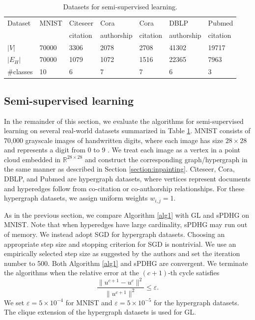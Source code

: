 \documentclass{article}
\theoremstyle{definition}
\begin{document}
\begin{table}[H]
  \centering
  \caption{Datasets for semi-supervised learning.}
    \begin{tabular}{lllllll}
    \toprule
    Dataset & MNIST & Citeseer & Cora & Cora & DBLP & Pubmed\\
            &       & citation & authorship & citation & authorship & citation \\
    \midrule
    $|V|$ & 70000 & 3306 & 2078 & 2708 & 41302 & 19717 \\
    $|E_H|$ & 70000 & 1079 & 1072 & 1516 & 22365 & 7963 \\
    \#classes & 10 & 6   & 7    & 7    & 6     & 3 \\
    \bottomrule
    \end{tabular}%
  \label{table:dataset}%
\end{table}



\subsection{Semi-supervised learning}
In the remainder of this section, we evaluate the algorithms for semi-supervised learning on several real-world datasets summarized in Table \ref{table:dataset}.
MNIST consists of 70,000 grayscale images of handwritten digits, where each image has size $28 \times 28$ and represents a digit from 0 to 9 \cite{lecun1998gradient}. We treat each image as a vertex in a point cloud embedded in $\mathbb{R}^{28 \times 28}$ and construct the corresponding graph/hypergraph in the same manner as described in Section \ref{section:inpainting}.
Citeseer, Cora, DBLP, and Pubmed \cite{sen2008collective} are hypergraph datasets, where vertices represent documents and hyperedges follow from co-citation or co-authorship relationships. For these hypergraph datasets, we assign uniform weights $w_{i,j} = 1$.


As in the previous section, we compare Algorithm \ref{alg1} with GL and sPDHG on MNIST.
Note that when hyperedges have large cardinality, sPDHG may run out of memory.
We instead adopt SGD for hypergraph datasets.
Choosing an appropriate step size and stopping criterion for SGD is nontrivial. We use an empirically selected step size as suggested by the authors \cite{zhang2017re} and set the iteration number to 500.
Both Algorithm \ref{alg1} and sPDHG are convergent.
We terminate the algorithms when the relative error at the $(c+1)$-th cycle satisfies
\begin{equation*}
  \frac{\|u^{c+1}-u^c\|^2}{\|u^{c+1}\|^2}\leq \varepsilon.
\end{equation*}
We set $\varepsilon=5\times 10^{-4}$ for MNIST and $\varepsilon=5\times 10^{-5}$ for the hypergraph datasets.
The clique extension of the hypergraph datasets is used for GL.
\end{document}
